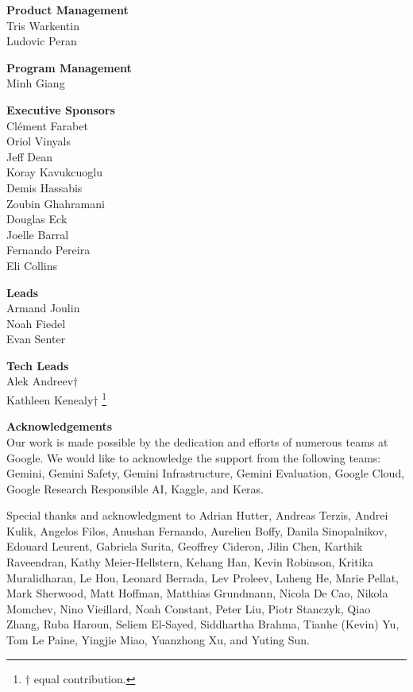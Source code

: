 \documentclass[11pt, a4paper, logo, twocolumn, copyright, nonumbering]{googledeepmind}
\begin{document}
\pagebreak
\noindent\textbf{Product Management} \\
Tris Warkentin \\
Ludovic Peran

\noindent\textbf{Program Management} \\
Minh Giang

\noindent\textbf{Executive Sponsors} \\
Clément Farabet \\
Oriol Vinyals \\
Jeff Dean \\
Koray Kavukcuoglu \\
Demis Hassabis \\
Zoubin Ghahramani \\
Douglas Eck \\
Joelle Barral \\
Fernando Pereira \\
Eli Collins

\noindent\textbf{Leads} \\
Armand Joulin \\
Noah Fiedel \\
Evan Senter

\noindent\textbf{Tech Leads} \\
Alek Andreev\begin{math}\dagger{}\end{math} \\
Kathleen Kenealy\begin{math}\dagger{}\end{math}
{\let\thefootnote\relax\footnote{\begin{math}\dagger{}\end{math} equal contribution.}}

\noindent\textbf{Acknowledgements} \\
Our work is made possible by the dedication and efforts of numerous teams at Google. We
would like to acknowledge the support from the following teams: Gemini, Gemini Safety, Gemini Infrastructure, Gemini Evaluation, Google Cloud, Google Research Responsible AI, Kaggle, and Keras.

\vspace{-3mm}
Special thanks and acknowledgment to Adrian Hutter, Andreas Terzis, Andrei Kulik, Angelos Filos, Anushan Fernando, Aurelien Boffy, Danila Sinopalnikov, Edouard Leurent, Gabriela Surita, Geoffrey Cideron, Jilin Chen, Karthik Raveendran, Kathy Meier-Hellstern, Kehang Han, Kevin Robinson, Kritika Muralidharan, Le Hou, Leonard Berrada, Lev Proleev, Luheng He, Marie Pellat, Mark Sherwood, Matt Hoffman, Matthias Grundmann, Nicola De Cao, Nikola Momchev, Nino Vieillard, Noah Constant, Peter Liu, Piotr Stanczyk, Qiao Zhang, Ruba Haroun, Seliem El-Sayed, Siddhartha Brahma, Tianhe (Kevin) Yu, Tom Le Paine, Yingjie Miao, Yuanzhong Xu, and Yuting Sun.
\end{document}
